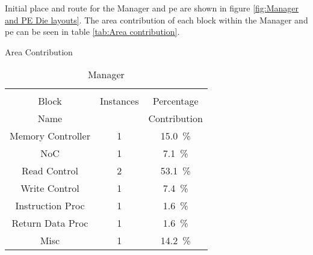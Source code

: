 Initial place and route for the Manager and \ac{pe} are shown in figure \ref{fig:Manager and PE Die layouts}. 
The area contribution of each block within the Manager and \ac{pe} can be seen in table \ref{tab:Area contribution}.
\begin{table}[h]
  \captionsetup{justification=centering, skip=3pt}
  \caption{Area Contribution}
  \vspace{3pt}
  \label{tab:Area contribution}
  \centering
  \begin{subtable}{0.75\textwidth}
    \centering
    \begin{adjustbox}{width=0.75\textwidth}
      \begin{tabular}{ccc}
        \toprule
                         &          &                                         \\  %
            Block        &Instances &Percentage                               \\  %
            Name         &          &Contribution                             \\  %
        \hline  %
  Memory Controller      & 1&\SI[per-mode=symbol]{15.0}{\percent}  \\ 
        NoC              & 1&\SI[per-mode=symbol]{ 7.1}{\percent}  \\
        Read Control     & 2&\SI[per-mode=symbol]{53.1}{\percent}  \\
        Write Control    & 1&\SI[per-mode=symbol]{ 7.4}{\percent}  \\
      Instruction Proc   & 1&\SI[per-mode=symbol]{ 1.6}{\percent}  \\
      Return Data Proc   & 1&\SI[per-mode=symbol]{ 1.6}{\percent}  \\
        Misc             & 1&\SI[per-mode=symbol]{14.2}{\percent}  \\
        \bottomrule
      \end{tabular}
    \end{adjustbox}
    \vspace{3pt}
    \captionsetup{justification=centering, skip=10pt}
    \caption{Manager}
    \label{tab:Manager Area Contribution}
  \end{subtable}

\end{table}
